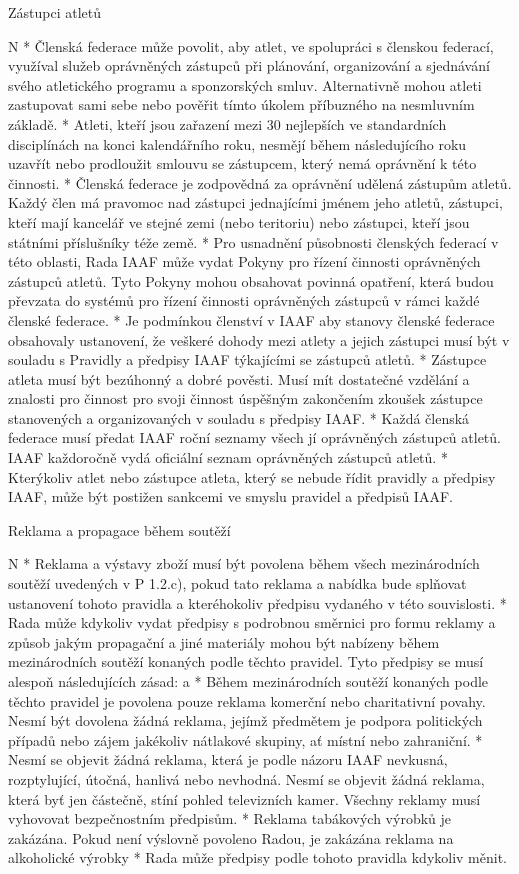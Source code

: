 \secc Zástupci atletů

\begitems \style N
* Členská federace může povolit, aby atlet, ve spolupráci s členskou federací, využíval služeb oprávněných zástupců při plánování, organizování a sjednávání svého atletického programu a sponzorských smluv. Alternativně mohou atleti zastupovat sami sebe nebo pověřit tímto úkolem příbuzného na nesmluvním základě.
* Atleti, kteří jsou zařazení mezi 30 nejlepších ve standardních disciplínách na konci kalendářního roku, nesmějí během následujícího roku uzavřít nebo prodloužit smlouvu se zástupcem, který nemá oprávnění k této činnosti.
* Členská federace je zodpovědná za oprávnění udělená zástupům atletů. Každý člen má pravomoc nad zástupci jednajícími jménem jeho atletů, zástupci, kteří mají kancelář ve stejné zemi (nebo teritoriu) nebo zástupci, kteří jsou státními příslušníky téže země.
* Pro usnadnění působnosti členských federací v této oblasti, Rada IAAF může vydat Pokyny pro řízení činnosti oprávněných zástupců atletů. Tyto Pokyny mohou obsahovat povinná opatření, která budou převzata do systémů pro řízení činnosti oprávněných zástupců v rámci každé členské federace.
* Je podmínkou členství v IAAF aby stanovy členské federace obsahovaly ustanovení, že veškeré dohody mezi atlety a jejich zástupci musí být v souladu s Pravidly a předpisy IAAF týkajícími se zástupců atletů.
* Zástupce atleta musí být bezúhonný a dobré pověsti. Musí mít dostatečné vzdělání a znalosti pro činnost pro svoji činnost úspěšným zakončením zkoušek zástupce stanovených a organizovaných v souladu s předpisy IAAF.
* Každá členská federace musí předat IAAF roční seznamy všech jí oprávněných zástupců atletů. IAAF každoročně vydá oficiální seznam oprávněných zástupců atletů.
* Kterýkoliv atlet nebo zástupce atleta, který se nebude řídit pravidly a předpisy IAAF, může být postižen sankcemi ve smyslu pravidel a předpisů IAAF.
\enditems

\secc Reklama a propagace během soutěží

\begitems \style N
* Reklama a výstavy zboží musí být povolena během všech mezinárodních soutěží uvedených v P 1.2.c), pokud tato reklama a nabídka bude splňovat ustanovení tohoto pravidla a kteréhokoliv předpisu vydaného v této souvislosti.
* Rada může kdykoliv vydat předpisy s podrobnou směrnici pro formu reklamy a způsob jakým propagační a jiné materiály mohou být nabízeny během mezinárodních soutěží konaných podle těchto pravidel. Tyto předpisy se musí alespoň následujících zásad:
  \begitems \style a
  * Během mezinárodních soutěží konaných podle těchto pravidel je povolena pouze reklama komerční nebo charitativní povahy. Nesmí být dovolena žádná reklama, jejímž předmětem je podpora politických případů nebo zájem jakékoliv nátlakové skupiny, ať místní nebo zahraniční.
  * Nesmí se objevit žádná reklama, která je podle názoru IAAF nevkusná, rozptylující, útočná, hanlivá nebo nevhodná. Nesmí se objevit žádná reklama, která byť jen částečně, stíní pohled televizních kamer. Všechny reklamy musí vyhovovat bezpečnostním předpisům.
  * Reklama tabákových výrobků je zakázána. Pokud není výslovně povoleno Radou, je zakázána reklama na alkoholické výrobky
  \enditems
* Rada může předpisy podle tohoto pravidla kdykoliv měnit.
\enditems

\endinput